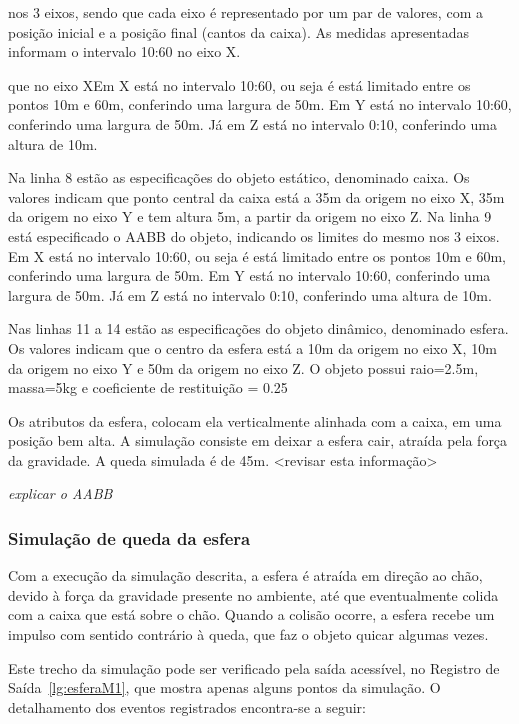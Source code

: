 \documentclass[12pt]{article}
\begin{document}
 nos 3 eixos, sendo que cada eixo é representado por um par de valores, com a posição inicial e a posição final (cantos da caixa). As medidas apresentadas informam o intervalo 10:60 no eixo X. 

que no eixo XEm X está no intervalo 10:60, ou seja é está limitado entre os pontos 10m e 60m, conferindo uma largura de 50m. Em Y está no intervalo 10:60, conferindo uma largura de 50m. Já em Z está no intervalo 0:10, conferindo uma altura de 10m.


Na linha 8 estão as especificações do objeto estático, denominado caixa. Os valores indicam que ponto central da caixa está a 35m da origem no eixo X, 35m da origem no eixo Y e tem altura 5m, a partir da origem no eixo Z. Na linha 9 está especificado o AABB do objeto, indicando os limites do mesmo nos 3 eixos. Em X está no intervalo 10:60, ou seja é está limitado entre os pontos 10m e 60m, conferindo uma largura de 50m. Em Y está no intervalo 10:60, conferindo uma largura de 50m. Já em Z está no intervalo 0:10, conferindo uma altura de 10m.

Nas linhas 11 a 14 estão as especificações do objeto dinâmico, denominado esfera. Os valores indicam que o centro da esfera está a 10m da origem no eixo X, 10m  da origem no eixo Y e 50m da origem no eixo Z. O objeto possui raio=2.5m, massa=5kg e coeficiente de restituição = 0.25

Os atributos da esfera, colocam ela verticalmente alinhada com a caixa, em uma posição bem alta. A simulação consiste em deixar a esfera cair, atraída pela força da gravidade. A queda simulada é de 45m. <revisar esta informação>


\emph{explicar o AABB}

\subsubsection{Simulação de queda da esfera}

Com a execução da simulação descrita, a esfera é atraída em direção ao chão, devido à força da gravidade presente no ambiente, até que eventualmente colida com a caixa que está sobre o chão. Quando a colisão ocorre, a esfera recebe um impulso com sentido contrário à queda, que faz o objeto quicar algumas vezes. 

Este trecho da simulação pode ser verificado pela saída acessível, no Registro de Saída~\ref{lg:esferaM1}, que mostra apenas alguns pontos da simulação. O detalhamento dos eventos registrados encontra-se a seguir:
\end{document}
